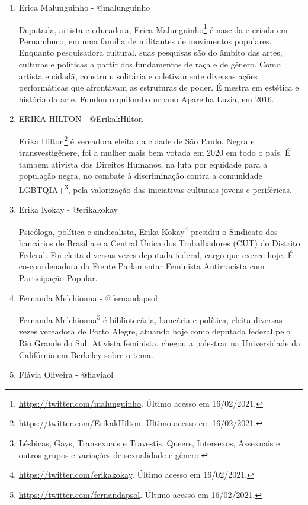 \documentclass[
	12pt,				%
	openright,			%
	twoside,			%
	a4paper,			%
	english,			%
	brazil				%
	]{abntex2}
\begin{document}
\begin{anexosenv}
\begin{enumerate}
 \item Erica Malunguinho - @malunguinho
 
 Deputada, artista e educadora, Erica Malunguinho\footnote{\url{https://twitter.com/malunguinho}. Último acesso em 16/02/2021.} é nascida e criada em Pernambuco, em uma família de militantes de movimentos populares. Enquanto pesquisadora cultural, suas pesquisas são do âmbito das artes, culturas e políticas a partir dos fundamentos de raça e de gênero. Como artista e cidadã, construiu solitária e coletivamente diversas ações performáticas que afrontavam as estruturas de poder. É mestra em estética e história da arte. Fundou o quilombo urbano Aparelha Luzia, em 2016.

 \item ERIKA HILTON - @ErikakHilton
 
 Erika Hilton\footnote{\url{https://twitter.com/ErikakHilton}. Último acesso em 16/02/2021.} é vereadora eleita da cidade de São Paulo. Negra e transvestigênere, foi a mulher mais bem votada em 2020 em todo o país. É também ativista dos Direitos Humanos, na luta por equidade para a população negra, no combate à discriminação contra a comunidade LGBTQIA+\footnote{Lésbicas, Gays, Transexuais e Travestis, Queers, Intersexos, Assexuais e outros grupos e variações de sexualidade e gênero.}, pela valorização das iniciativas culturais jovens e periféricas.

 \item Erika Kokay - @erikakokay
 
 Psicóloga, política e sindicalista, Erika Kokay\footnote{\url{https://twitter.com/erikakokay}. Último acesso em 16/02/2021.} presidiu o Sindicato dos bancários de Brasília e a Central Única dos Trabalhadores (CUT) do Distrito Federal. Foi eleita diversas vezes deputada federal, cargo que exerce hoje. É co-coordenadora da Frente Parlamentar Feminista Antirracista com Participação Popular.

 \item Fernanda Melchionna - @fernandapsol
 
 Fernanda Melchionna\footnote{\url{https://twitter.com/fernandapsol}. Último acesso em 16/02/2021.} é bibliotecária, bancária e política, eleita diversas vezes vereadora de Porto Alegre, atuando hoje como deputada federal pelo Rio Grande do Sul. Ativista feminista, chegou a palestrar na Universidade da Califórnia em Berkeley sobre o tema.
 
 \item Flávia Oliveira - @flaviaol
 

\end{enumerate}
\end{anexosenv}
\end{document}
